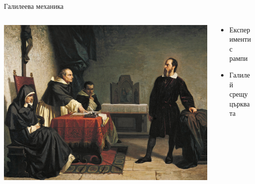 \documentclass[10pt,a4paper]{beamer}
\begin{document}
        \begin{frame}{ Галилеева механика }
            \begin{columns}
                \begin{column}{0.5\textwidth}
                    \includegraphics[width=\textwidth]{images/galieli_inqusition.jpg}
                \end{column}
                \begin{column}{0.5\textwidth}
                    \begin{itemize}
                        \item Експерименти с рампи
                        \item Галилей срещу църквата
                    \end{itemize}
                \end{column}
            \end{columns}
        \end{frame}
        
\end{document}
